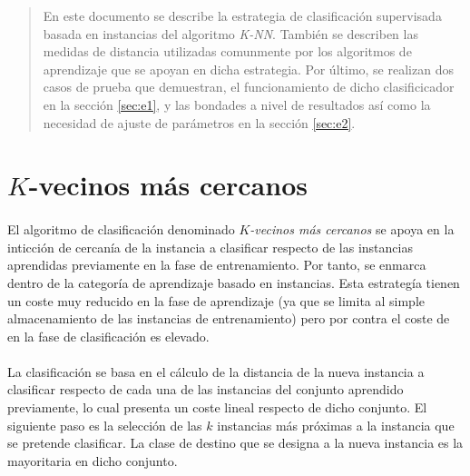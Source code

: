 \documentclass{article}
\begin{document}
	\maketitle %

	\thispagestyle{fancy} %



	\begin{abstract}
		\noindent En este documento se describe la estrategia de clasificación supervisada basada en instancias del algoritmo \emph{K-NN}. También se describen las medidas de distancia utilizadas comunmente por los algoritmos de aprendizaje que se apoyan en dicha estrategia. Por último, se realizan dos casos de prueba que demuestran, el funcionamiento de dicho clasificicador en la sección \ref{sec:e1}, y las bondades a nivel de resultados así como la necesidad de ajuste de parámetros en la sección \ref{sec:e2}.
	\end{abstract}



	\section{$K$-vecinos más cercanos}

		\paragraph{}
		El algoritmo de clasificación denominado \emph{$K$-vecinos más cercanos} se apoya en la inticción de cercanía de la instancia a clasificar respecto de las instancias aprendidas previamente en la fase de entrenamiento. Por tanto, se enmarca dentro de la categoría de aprendizaje basado en instancias. Esta estrategía tienen un coste muy reducido en la fase de aprendizaje (ya que se limita al simple almacenamiento de las instancias de entrenamiento) pero por contra el coste de en la fase de clasificación es elevado.

		\paragraph{}
		La clasificación se basa en el cálculo de la distancia de la nueva instancia a clasificar respecto de cada una de las instancias del conjunto aprendido previamente, lo cual presenta un coste lineal respecto de dicho conjunto. El siguiente paso es la selección de las $k$ instancias más próximas a la instancia que se pretende clasificar. La clase de destino que se designa a la nueva instancia es la mayoritaria en dicho conjunto.
\end{document}
